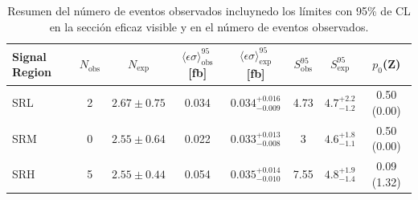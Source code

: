 \begin{table}[!h]
  \centering
  \caption{Resumen del número de eventos observados incluynedo los límites con 95\% de CL en la sección eficaz visible y en el número de eventos observados.}

  \begin{tabular}{lccccccc}
    \hline
    \hline
    Signal Region & $N_{\mathrm{obs}}$  & $N_{\mathrm{exp}}$  & $\langle\epsilon{\sigma}\rangle_{\mathrm{obs}}^{95}$ [fb]  & $\langle\epsilon{\sigma}\rangle_{\mathrm{exp}}^{95}$ [fb] & $S_{\mathrm{obs}}^{95}$  & $S_{\mathrm{exp}}^{95}$ & $p_{0}$(Z)\\
    \hline
    SRL  &   2   & $2.67 \pm 0.75$  &   0.034   &   $0.034^{+0.016}_{-0.009}$   &   4.73   &   $4.7^{+2.2}_{-1.2}$    &    0.50 (0.00)  \\
    SRM  &   0   & $2.55 \pm 0.64$  &   0.022   &   $0.033^{+0.013}_{-0.008}$   &   3      &   $4.6^{+1.8}_{-1.1}$    &    0.50 (0.00)  \\
    SRH  &   5   & $2.55 \pm 0.44$  &   0.054   &   $0.035^{+0.014}_{-0.010}$   &   7.55   &   $4.8^{+1.9}_{-1.4}$    &    0.09 (1.32)  \\
    \hline
    \hline
  \end{tabular}
  \label{tab:model_indep_ul}
\end{table}




